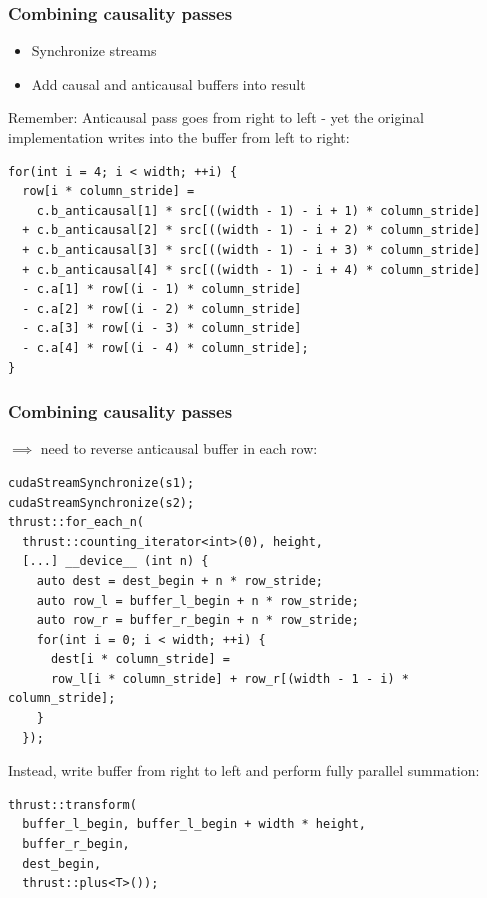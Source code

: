 \documentclass{beamer}
\begin{document}
\begin{frame}[fragile]
  \frametitle{Combining causality passes}
  \begin{itemize}
    \item Synchronize streams
    \item Add causal and anticausal buffers into result
  \end{itemize}
  Remember: Anticausal pass goes from right to left - yet the original
  implementation writes into the buffer from left to right:
  \begin{lstlisting}[basicstyle=\tiny]
for(int i = 4; i < width; ++i) {
  row[i * column_stride] =
    c.b_anticausal[1] * src[((width - 1) - i + 1) * column_stride]
  + c.b_anticausal[2] * src[((width - 1) - i + 2) * column_stride]
  + c.b_anticausal[3] * src[((width - 1) - i + 3) * column_stride]
  + c.b_anticausal[4] * src[((width - 1) - i + 4) * column_stride]
  - c.a[1] * row[(i - 1) * column_stride]
  - c.a[2] * row[(i - 2) * column_stride]
  - c.a[3] * row[(i - 3) * column_stride]
  - c.a[4] * row[(i - 4) * column_stride];
}
  \end{lstlisting}
\end{frame}

\begin{frame}[fragile]
  \frametitle{Combining causality passes}
  $\implies$ need to reverse anticausal buffer in each row:
  \begin{lstlisting}[basicstyle=\tiny]
cudaStreamSynchronize(s1);
cudaStreamSynchronize(s2);
thrust::for_each_n(
  thrust::counting_iterator<int>(0), height,
  [...] __device__ (int n) {
    auto dest = dest_begin + n * row_stride;
    auto row_l = buffer_l_begin + n * row_stride;
    auto row_r = buffer_r_begin + n * row_stride;
    for(int i = 0; i < width; ++i) {
      dest[i * column_stride] =
      row_l[i * column_stride] + row_r[(width - 1 - i) * column_stride];
    }
  });
  \end{lstlisting}
  Instead, write buffer from right to left and perform fully parallel
  summation:
  \begin{lstlisting}[basicstyle=\tiny]
thrust::transform(
  buffer_l_begin, buffer_l_begin + width * height,
  buffer_r_begin,
  dest_begin,
  thrust::plus<T>());
  \end{lstlisting}
\end{frame}
\end{document}
